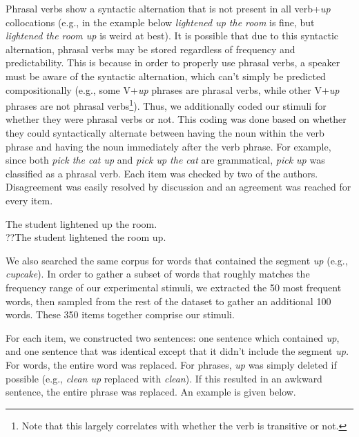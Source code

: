 \documentclass[
  12pt,
  letterpaper,
]{scrreport}
\begin{document}
Phrasal verbs show a syntactic alternation that is not present in all
verb+\emph{up} collocations (e.g., in the example below \emph{lightened
up the room} is fine, but \emph{lightened the room up} is weird at
best). It is possible that due to this syntactic alternation, phrasal
verbs may be stored regardless of frequency and predictability. This is
because in order to properly use phrasal verbs, a speaker must be aware
of the syntactic alternation, which can't simply be predicted
compositionally (e.g., some V+\emph{up} phrases are phrasal verbs, while
other V+\emph{up} phrases are not phrasal verbs\footnote{Note that this
  largely correlates with whether the verb is transitive or not.}).
Thus, we additionally coded our stimuli for whether they were phrasal
verbs or not. This coding was done based on whether they could
syntactically alternate between having the noun within the verb phrase
and having the noun immediately after the verb phrase. For example,
since both \emph{pick the cat up} and \emph{pick up the cat} are
grammatical, \emph{pick up} was classified as a phrasal verb. Each item
was checked by two of the authors. Disagreement was easily resolved by
discussion and an agreement was reached for every item.

\begin{exe} 
\ex
  \begin{singlespace}
  \begin{xlist}
    \ex The student lightened up the room. \\
    \ex ??The student lightened the room up. \\
  \end{xlist}
  \end{singlespace}
\end{exe}

We also searched the same corpus for words that contained the segment
\emph{up} (e.g., \emph{cupcake}). In order to gather a subset of words
that roughly matches the frequency range of our experimental stimuli, we
extracted the 50 most frequent words, then sampled from the rest of the
dataset to gather an additional 100 words. These 350 items together
comprise our stimuli.

For each item, we constructed two sentences: one sentence which
contained \emph{up}, and one sentence that was identical except that it
didn't include the segment \emph{up.} For words, the entire word was
replaced. For phrases, \emph{up} was simply deleted if possible (e.g.,
\emph{clean up} replaced with \emph{clean}). If this resulted in an
awkward sentence, the entire phrase was replaced. An example is given
below.
\end{document}
